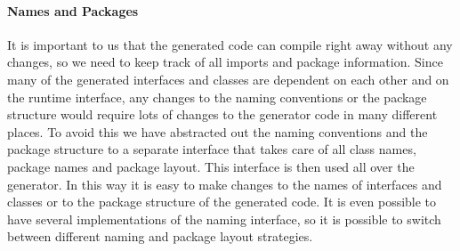 \paragraph{Names and Packages}

It is important to us that the generated code can compile right away
without any changes, so we need to keep track of all imports and package
information. Since many of the generated interfaces and classes are
dependent on each other and on the runtime interface, any changes
to the naming conventions or the package structure would require lots
of changes to the generator code in many different places. To avoid
this we have abstracted out the naming conventions and the package
structure to a separate interface that takes care of all class names,
package names and package layout. This interface is then used all
over the generator. In this way it is easy to make changes to the
names of interfaces and classes or to the package structure of the
generated code. It is even possible to have several implementations
of the naming interface, so it is possible to switch between different
naming and package layout strategies.

